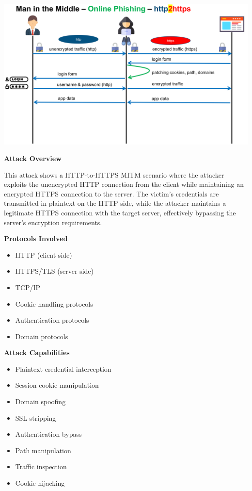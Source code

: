 \begin{center}
\includegraphics[width=\textwidth]{resources/07-mitm-online-phishing-http2https.png}  
\end{center}
\textbf{Attack Overview}

This attack shows a HTTP-to-HTTPS MITM scenario where the attacker exploits the unencrypted HTTP connection from the client while maintaining an encrypted HTTPS connection to the server. The victim's credentials are transmitted in plaintext on the HTTP side, while the attacker maintains a legitimate HTTPS connection with the target server, effectively bypassing the server's encryption requirements.

\textbf{Protocols Involved}
\begin{itemize}
    \item HTTP (client side)
    \item HTTPS/TLS (server side)
    \item TCP/IP
    \item Cookie handling protocols
    \item Authentication protocols
    \item Domain protocols
\end{itemize}

\textbf{Attack Capabilities}
\begin{itemize}
    \item Plaintext credential interception
    \item Session cookie manipulation
    \item Domain spoofing
    \item SSL stripping
    \item Authentication bypass
    \item Path manipulation
    \item Traffic inspection
    \item Cookie hijacking
\end{itemize}

